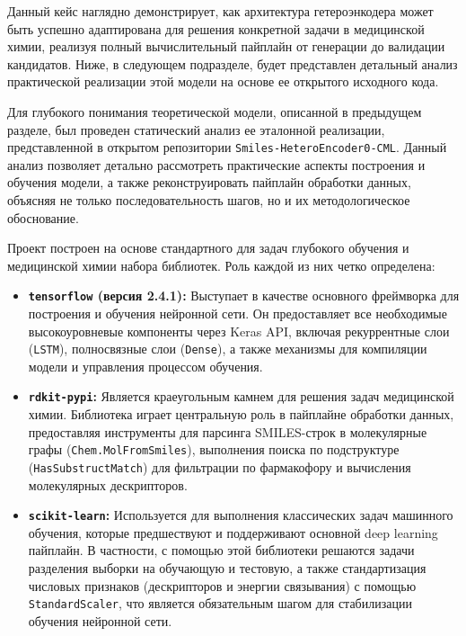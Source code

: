 Данный кейс наглядно демонстрирует, как архитектура гетероэнкодера может быть успешно адаптирована для решения конкретной задачи в медицинской химии, реализуя полный вычислительный пайплайн от генерации до валидации кандидатов. Ниже, в следующем подразделе, будет представлен детальный анализ практической реализации этой модели на основе ее открытого исходного кода.


Для глубокого понимания теоретической модели, описанной в предыдущем разделе, был проведен статический анализ ее эталонной реализации, представленной в открытом репозитории \texttt{Smiles-HeteroEncoder0-CML}. Данный анализ позволяет детально рассмотреть практические аспекты построения и обучения модели, а также реконструировать пайплайн обработки данных, объясняя не только последовательность шагов, но и их методологическое обоснование.


Проект построен на основе стандартного для задач глубокого обучения и медицинской химии набора библиотек. Роль каждой из них четко определена:
\begin{itemize}
	\item \textbf{\texttt{tensorflow} (версия 2.4.1):} Выступает в качестве основного фреймворка для построения и обучения нейронной сети. Он предоставляет все необходимые высокоуровневые компоненты через Keras API, включая рекуррентные слои (\texttt{LSTM}), полносвязные слои (\texttt{Dense}), а также механизмы для компиляции модели и управления процессом обучения.
	\item \textbf{\texttt{rdkit-pypi}:} Является краеугольным камнем для решения задач медицинской химии. Библиотека играет центральную роль в пайплайне обработки данных, предоставляя инструменты для парсинга SMILES-строк в молекулярные графы (\texttt{Chem.MolFromSmiles}), выполнения поиска по подструктуре (\texttt{HasSubstructMatch}) для фильтрации по фармакофору и вычисления молекулярных дескрипторов.
	\item \textbf{\texttt{scikit-learn}:} Используется для выполнения классических задач машинного обучения, которые предшествуют и поддерживают основной deep learning пайплайн. В частности, с помощью этой библиотеки решаются задачи разделения выборки на обучающую и тестовую, а также стандартизация числовых признаков (дескрипторов и энергии связывания) с помощью \texttt{StandardScaler}, что является обязательным шагом для стабилизации обучения нейронной сети.
\end{itemize}

